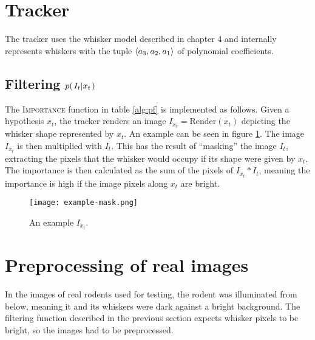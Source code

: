 \section{Tracker}

The tracker uses the whisker model described in chapter 4 and
internally represents whiskers with the tuple $\langle a_3, a_2, a_1 \rangle$ of polynomial
coefficients.

\subsection{Filtering $p{(\left. I_t \middle\vert x_t \right.)}$}

The \textsc{Importance} function in table \ref{alg:pf} is implemented
as follows. Given a hypothesis $x_t$, the tracker renders an image
$I_{x_t} = \text{Render}(x_t)$ depicting the whisker shape represented
by $x_t$. An example can be seen in figure \ref{fig:example-mask}. The
image $I_{x_t}$ is then multiplied with $I_t$. This has the result of
``masking'' the image $I_t$, extracting the pixels that the whisker
would occupy if its shape were given by $x_t$. The importance is then
calculated as the sum of the pixels of $I_{x_t} * I_t$, meaning
the importance is high if the image pixels along $x_t$ are bright.

\begin{figure}[h]
  \centering
  \texttt{[image: example-mask.png]}
  \caption{An example $I_{x_t}$.}
  \label{fig:example-mask}
\end{figure}


\section{Preprocessing of real images}

In the images of real rodents used for testing, the rodent was
illuminated from below, meaning it and its whiskers were dark against
a bright background. The filtering function described in the previous
section expects whisker pixels to be bright, so the images had to be
preprocessed.
